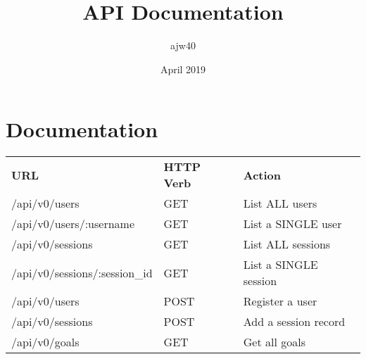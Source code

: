 \documentclass{stacs_cw}
\begin{document}
\title{API Documentation}
\author{ajw40}
\date{April 2019}
\maketitle
\section*{Documentation}

\begin{table}[H]
	\begin{tabular}{lll}
	\textbf{URL} & \textbf{HTTP Verb}  & \textbf{Action} \\
	/api/v0/users & GET  &  List ALL users\\
	/api/v0/users/:username & GET  & List a SINGLE user\\
	/api/v0/sessions & GET  & List ALL sessions \\
	/api/v0/sessions/:session\_id & GET  &  List a SINGLE session \\
	/api/v0/users & POST & Register a user \\
	/api/v0/sessions & POST & Add a session record \\
	/api/v0/goals & GET & Get all goals\\
	\end{tabular}
	\end{table}
\newpage
\end{document}
